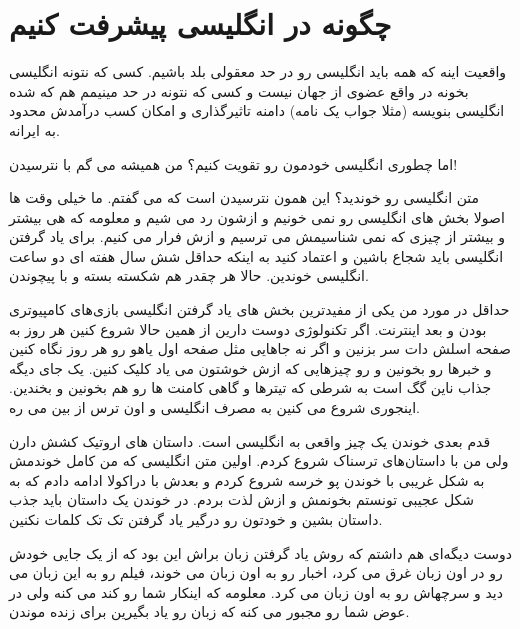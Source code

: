 \section{چگونه در انگلیسی پیشرفت کنیم}
واقعیت اینه که همه باید انگلیسی رو در حد معقولی بلد باشیم. کسی که نتونه انگلیسی بخونه در واقع عضوی از جهان نیست و کسی که نتونه در حد مینیمم هم که شده انگلیسی بنویسه (مثلا جواب یک نامه) دامنه تاثیرگذاری و امکان کسب درآمدش محدود به ایرانه.

اما چطوری انگلیسی خودمون رو تقویت کنیم؟ من همیشه می گم با نترسیدن!
\begin{flushleft}
\end{flushleft}
متن انگلیسی رو خوندید؟ این همون نترسیدن است که می گفتم. ما خیلی وقت ها اصولا بخش های انگلیسی رو نمی خونیم و ازشون رد می شیم و معلومه که هی بیشتر و بیشتر از چیزی که نمی شناسیمش می ترسیم و ازش فرار می کنیم. برای یاد گرفتن انگلیسی باید شجاع باشین و اعتماد کنید به اینکه حداقل شش سال هفته ای دو ساعت انگلیسی خوندین. حالا هر چقدر هم شکسته بسته و با پیچوندن.

حداقل در مورد من یکی از مفیدترین بخش های یاد گرفتن انگلیسی بازی‌های کامپیوتری بودن و بعد اینترنت. اگر تکنولوژی دوست دارین از همین حالا شروع کنین هر روز به صفحه اسلش دات
سر بزنین و اگر نه جاهایی مثل صفحه اول یاهو رو هر روز نگاه کنین و خبرها رو بخونین و رو چیزهایی که ازش خوشتون می یاد کلیک کنین. یک جای دیگه جذاب ناین گگ
است به شرطی که تیترها و گاهی کامنت ها رو هم بخونین و بخندین. اینجوری شروع می کنین به مصرف انگلیسی و اون ترس از بین می ره. 

قدم بعدی خوندن یک چیز واقعی به انگلیسی است. داستان های اروتیک کشش دارن ولی من با داستان‌های ترسناک شروع کردم. اولین متن انگلیسی که من کامل خوندمش به شکل غریبی با خوندن پو خرسه
شروع کردم و بعدش با دراکولا
 ادامه دادم که به شکل عجیبی تونستم بخونمش و ازش لذت بردم.
 در خوندن یک داستان باید جذب داستان بشین و خودتون رو درگیر یاد گرفتن تک تک کلمات نکنین.

دوست دیگه‌ای هم داشتم که روش یاد گرفتن زبان براش این بود که از یک جایی خودش رو در اون زبان غرق می کرد، اخبار رو به اون زبان می خوند، فیلم رو به این زبان می دید و سرچهاش رو به اون زبان می کرد. معلومه که اینکار شما رو کند می کنه ولی در عوض شما رو مجبور می کنه که زبان رو یاد بگیرین برای زنده موندن.


